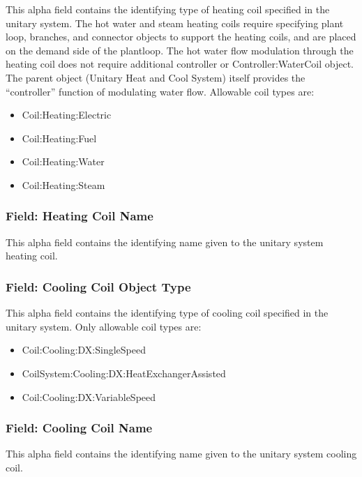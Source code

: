 This alpha field contains the identifying type of heating coil specified in the unitary system. The hot water and steam heating coils require specifying plant loop, branches, and connector objects to support the heating coils, and are placed on the demand side of the plantloop. The hot water flow modulation through the heating coil does not require additional controller or Controller:WaterCoil object. The parent object (Unitary Heat and Cool System) itself provides the ``controller'' function of modulating water flow. Allowable coil types are:

\begin{itemize}
\item
  Coil:Heating:Electric
\item
  Coil:Heating:Fuel
\item
  Coil:Heating:Water
\item
  Coil:Heating:Steam
\end{itemize}

\subsubsection{Field: Heating Coil Name}\label{field-heating-coil-name-2}

This alpha field contains the identifying name given to the unitary system heating coil.

\subsubsection{Field: Cooling Coil Object Type}\label{field-cooling-coil-object-type-2-000}

This alpha field contains the identifying type of cooling coil specified in the unitary system. Only allowable coil types are:

\begin{itemize}
\item
  Coil:Cooling:DX:SingleSpeed
\item
  CoilSystem:Cooling:DX:HeatExchangerAssisted
\item
  Coil:Cooling:DX:VariableSpeed
\end{itemize}

\subsubsection{Field: Cooling Coil Name}\label{field-cooling-coil-name-2-000}

This alpha field contains the identifying name given to the unitary system cooling coil.

